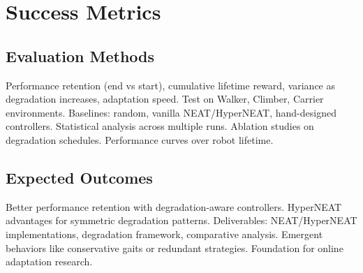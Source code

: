 \documentclass[journal,12pt,onecolumn]{IEEEtran}
\begin{document}
\section{Success Metrics}

\subsection{Evaluation Methods}
Performance retention (end vs start), cumulative lifetime reward, variance as degradation increases, adaptation speed. Test on Walker, Climber, Carrier environments. Baselines: random, vanilla NEAT/HyperNEAT, hand-designed controllers. Statistical analysis across multiple runs. Ablation studies on degradation schedules. Performance curves over robot lifetime.

\subsection{Expected Outcomes}
Better performance retention with degradation-aware controllers. HyperNEAT advantages for symmetric degradation patterns. Deliverables: NEAT/HyperNEAT implementations, degradation framework, comparative analysis. Emergent behaviors like conservative gaits or redundant strategies. Foundation for online adaptation research.



\end{document}
